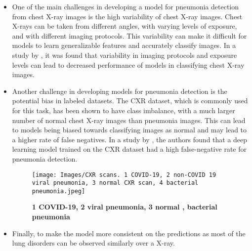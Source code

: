 {
	 \begin{itemize}
	\item One of the main challenges in developing a model for pneumonia detection from chest X-ray images is the high variability of chest X-ray images. Chest X-rays can be taken from different angles, with varying levels of exposure, and with different imaging protocols. This variability can make it difficult for models to learn generalizable features and accurately classify images. In a study by \cite{wang:2020}, it was found that variability in imaging protocols and exposure levels can lead to decreased performance of  models in classifying chest X-ray images.\newline\newpage
	
	\item Another challenge in developing models for pneumonia detection is the potential bias in labeled datasets. The CXR dataset, which is commonly used for this task, has been shown to have class imbalance, with a much larger number of normal chest X-ray images than pneumonia images. This can lead to models being biased towards classifying images as normal and may lead to a higher rate of false negatives. In a study by \cite{Ibrahim:2021}, the authors found that a deep learning model trained on the CXR dataset had a high false-negative rate for pneumonia detection.\newline\newpage
	
		\begin{figure}
		\texttt{[image: Images/CXR scans. 1 COVID-19, 2 non-COVID 19 viral pneumonia, 3 normal CXR scan, 4 bacterial pneumonia.jpeg]}
		\caption{\textbf{1 COVID-19, 2  viral pneumonia, 3 normal ,  bacterial pneumonia\cite{Lim:2022}}}
		\label{fig: 1 COVID-19, 2  viral pneumonia, 3 normal , 4 bacterial pneumonia}
	\end{figure} 
	
	
	\item Finally, to make the model more consistent on the predictions as most of the lung disorders can be observed similarly over a X-ray.
	
\end{itemize} 
 
}
